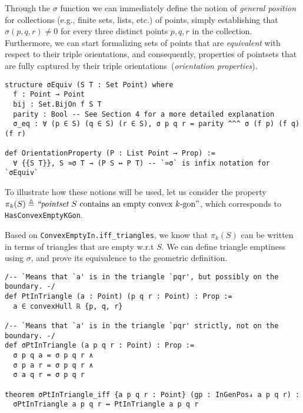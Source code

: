 Through the $\sigma$ function we can immediately define the notion of \emph{general position} for collections (e.g., finite sets, lists, etc.) of points, simply establishing that $\sigma(p, q, r) \neq 0$ for every three distinct points $p, q, r$ in the collection.
Furthermore, we can start formalizing sets of points that are \emph{equivalent} with respect to their triple orientations, and consequently, properties of pointsets that are fully captured by their triple orientations~(\emph{orientation properties}).
% 
\begin{lstlisting}
structure σEquiv (S T : Set Point) where
  f : Point → Point
  bij : Set.BijOn f S T
  parity : Bool -- See Section 4 for a more detailed explanation
  σ_eq : ∀ (p ∈ S) (q ∈ S) (r ∈ S), σ p q r = parity ^^^ σ (f p) (f q) (f r)

def OrientationProperty (P : List Point → Prop) :=
  ∀ {{S T}}, S ≃σ T → (P S ↔ P T) -- `≃σ` is infix notation for `σEquiv`
\end{lstlisting}

To illustrate how these notions will be used, let us consider the property
\(
  \pi_k(S) \triangleq \text{\em ``pointset } S \text{ contains an empty convex } k\text{-gon''}
\),  which corresponds to \lstinline|HasConvexEmptyKGon|.

Based on \lstinline|ConvexEmptyIn.iff_triangles|, we know that $\pi_k(S)$ can be written in terms of triangles that are empty w.r.t $S$. We can define triangle emptiness using $\sigma$, and prove its equivalence to the geometric definition.
\begin{lstlisting}
/-- `Means that `a' is in the triangle `pqr', but possibly on the boundary. -/
def PtInTriangle (a : Point) (p q r : Point) : Prop :=
  a ∈ convexHull ℝ {p, q, r}

/-- `Means that `a' is in the triangle `pqr' strictly, not on the boundary. -/
def σPtInTriangle (a p q r : Point) : Prop :=
  σ p q a = σ p q r ∧
  σ p a r = σ p q r ∧
  σ a q r = σ p q r

theorem σPtInTriangle_iff {a p q r : Point} (gp : InGenPos₄ a p q r) :
  σPtInTriangle a p q r ↔ PtInTriangle a p q r
\end{lstlisting}



